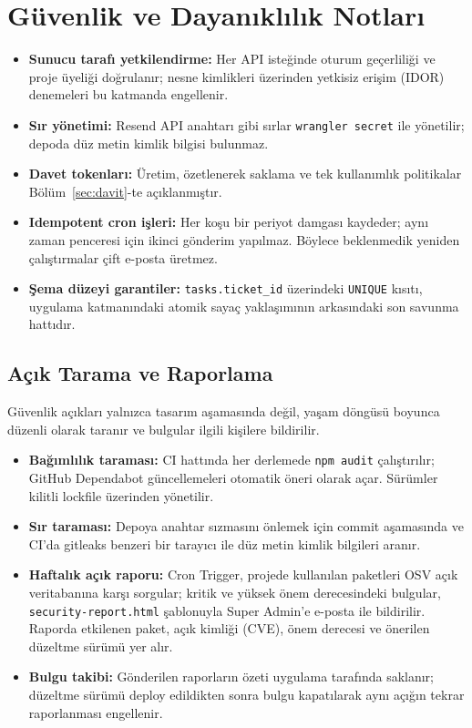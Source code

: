 \documentclass[11pt,a4paper]{article}
\begin{document}
\section{Güvenlik ve Dayanıklılık Notları}
\label{sec:guvenlik}

\begin{itemize}
  \item \textbf{Sunucu tarafı yetkilendirme:} Her API isteğinde oturum
  geçerliliği ve proje üyeliği doğrulanır; nesne kimlikleri üzerinden
  yetkisiz erişim (IDOR) denemeleri bu katmanda engellenir.
  \item \textbf{Sır yönetimi:} Resend API anahtarı gibi sırlar
  \texttt{wrangler secret} ile yönetilir; depoda düz metin kimlik
  bilgisi bulunmaz.
  \item \textbf{Davet tokenları:} Üretim, özetlenerek saklama ve tek
  kullanımlık politikalar Bölüm~\ref{sec:davit}-te açıklanmıştır.
  \item \textbf{Idempotent cron işleri:} Her koşu bir periyot damgası
  kaydeder; aynı zaman penceresi için ikinci gönderim yapılmaz. Böylece
  beklenmedik yeniden çalıştırmalar çift e-posta üretmez.
  \item \textbf{Şema düzeyi garantiler:} \texttt{tasks.ticket\_id}
  üzerindeki \texttt{UNIQUE} kısıtı, uygulama katmanındaki atomik sayaç
  yaklaşımının arkasındaki son savunma hattıdır.
\end{itemize}

\subsection{Açık Tarama ve Raporlama}

Güvenlik açıkları yalnızca tasarım aşamasında değil, yaşam döngüsü
boyunca düzenli olarak taranır ve bulgular ilgili kişilere bildirilir.

\begin{itemize}
  \item \textbf{Bağımlılık taraması:} CI hattında her derlemede
  \texttt{npm audit} çalıştırılır; GitHub Dependabot güncellemeleri
  otomatik öneri olarak açar. Sürümler kilitli lockfile üzerinden
  yönetilir.
  \item \textbf{Sır taraması:} Depoya anahtar sızmasını önlemek için
  commit aşamasında ve CI'da gitleaks benzeri bir tarayıcı ile düz
  metin kimlik bilgileri aranır.
  \item \textbf{Haftalık açık raporu:} Cron Trigger, projede kullanılan
  paketleri OSV açık veritabanına karşı sorgular; kritik ve yüksek
  önem derecesindeki bulgular, \texttt{security-report.html} şablonuyla
  Super Admin'e e-posta ile bildirilir. Raporda etkilenen paket, açık
  kimliği (CVE), önem derecesi ve önerilen düzeltme sürümü yer alır.
  \item \textbf{Bulgu takibi:} Gönderilen raporların özeti uygulama
  tarafında saklanır; düzeltme sürümü deploy edildikten sonra bulgu
  kapatılarak aynı açığın tekrar raporlanması engellenir.
\end{itemize}
\end{document}
